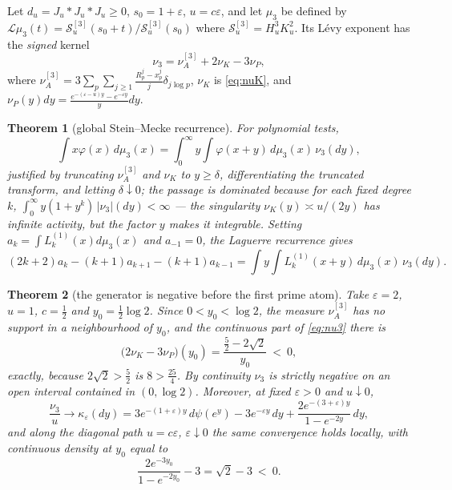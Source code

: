 \documentclass[11pt]{amsart}
\newtheorem{theorem}{Theorem}[section]
\theoremstyle{definition}
\theoremstyle{remark}
\theoremstyle{definition}
\newcommand{\eps}{\varepsilon}
\begin{document}
Let $d_u=J_u*J_u*J_u\ge0$, $s_0=1+\eps$, $u=c\eps$, and let $\mu_3$ be defined by
$\mathcal L\mu_3(t)=\mathcal S_u^{[3]}(s_0+t)/\mathcal S_u^{[3]}(s_0)$ where
$\mathcal S_u^{[3]}=H_u^3K_u^2$. Its L\'evy exponent has the \emph{signed} kernel
\begin{equation}\label{eq:nu3}
   \nu_3=\nu_A^{[3]}+2\nu_K-3\nu_P ,
\end{equation}
where $\nu_A^{[3]}=3\sum_p\sum_{j\ge1}\tfrac{R_p^j-x_p^j}{j}\delta_{j\log p}$,
$\nu_K$ is \eqref{eq:nuK}, and
$\nu_P(y)dy=\tfrac{e^{-(\eps-u)y}-e^{-\eps y}}{y}dy$.

\begin{theorem}[global Stein--Mecke recurrence]\label{thm:stein}
For polynomial tests,
\begin{equation}\label{eq:mecke}
   \int x\varphi(x)\,d\mu_3(x)
   =\int_0^\infty y\int\varphi(x+y)\,d\mu_3(x)\,\nu_3(dy),
\end{equation}
justified by truncating $\nu_A^{[3]}$ and $\nu_K$ to $y\ge\delta$, differentiating the truncated
transform, and letting $\delta\downarrow0$; the passage is dominated because for each fixed
degree $k$,
$\int_0^\infty y(1+y^k)\,|\nu_3|(dy)<\infty$ --- the singularity $\nu_K(y)\asymp u/(2y)$ has
infinite activity, but the factor $y$ makes it integrable. Setting
$a_k=\int L^{(1)}_k(x)d\mu_3(x)$ and $a_{-1}=0$, the Laguerre recurrence gives
\begin{equation}\label{eq:stein-rec}
   (2k+2)a_k-(k+1)a_{k+1}-(k+1)a_{k-1}
   =\int y\int L^{(1)}_k(x+y)\,d\mu_3(x)\,\nu_3(dy).
\end{equation}
\end{theorem}

\begin{theorem}[the generator is negative before the first prime atom]
\label{thm:stein-witness}
Take $\eps=2$, $u=1$, $c=\tfrac12$ and $y_0=\tfrac12\log2$. Since $0<y_0<\log2$, the measure
$\nu_A^{[3]}$ has no support in a neighbourhood of $y_0$, and the continuous part of
\eqref{eq:nu3} there is
\begin{equation}\label{eq:stein-neg}
   \bigl(2\nu_K-3\nu_P\bigr)(y_0)=\frac{\tfrac52-2\sqrt2}{y_0}\ <\ 0 ,
\end{equation}
exactly, because $2\sqrt2>\tfrac52$ is $8>\tfrac{25}{4}$. By continuity $\nu_3$ is strictly
negative on an open interval contained in $(0,\log2)$. Moreover, at fixed $\eps>0$ and
$u\downarrow0$,
\begin{equation}\label{eq:kappa}
   \frac{\nu_3}{u}\longrightarrow\kappa_\eps(dy)
   =3e^{-(1+\eps)y}\,d\psi(e^y)-3e^{-\eps y}\,dy
   +\frac{2e^{-(3+\eps)y}}{1-e^{-2y}}\,dy ,
\end{equation}
and along the diagonal path $u=c\eps$, $\eps\downarrow0$ the same convergence holds locally, with
continuous density at $y_0$ equal to
\begin{equation}\label{eq:kappa-neg}
   \frac{2e^{-3y_0}}{1-e^{-2y_0}}-3=\sqrt2-3\ <\ 0 .
\end{equation}
\end{theorem}
\end{document}
